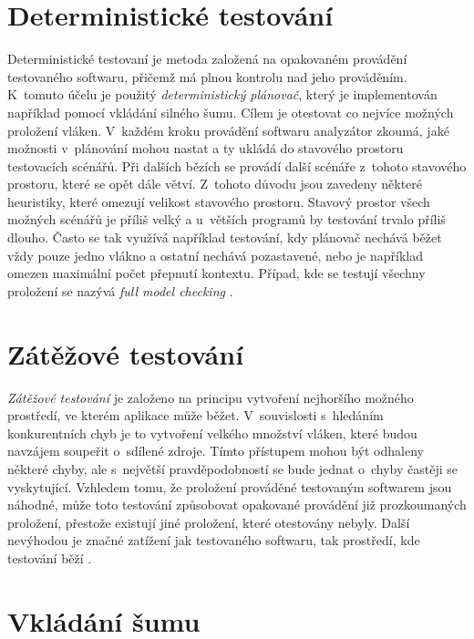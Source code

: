 \section{Deterministické testování}

Deterministické testovaní je metoda založená na opakovaném provádění testovaného softwaru, přičemž má plnou kontrolu nad jeho prováděním. K~tomuto účelu je použitý \textit{deterministický plánovač}, který je implementován například pomocí vkládání silného šumu. Cílem je otestovat co nejvíce možných proložení vláken. V~každém kroku provádění softwaru analyzátor zkoumá, jaké možnosti v~plánování mohou nastat a ty ukládá do stavového prostoru testovacích scénářů. Při dalších bězích se provádí další scénáře z~tohoto stavového prostoru, které se opět dále větví. Z~tohoto důvodu jsou zavedeny některé heuristiky, které omezují velikost stavového prostoru. Stavový prostor všech možných scénářů je příliš velký a u~větších programů by testování trvalo příliš dlouho. Často se tak využívá například testování, kdy plánovač nechává běžet vždy pouze jedno vlákno a ostatní nechává pozastavené, nebo je například omezen maximální počet přepnutí kontextu. Případ, kde se testují všechny proložení se nazývá \textit{full model checking} \cite{cite:advances}.

\section{Zátěžové testování}

\textit{Zátěžové testování} je založeno na principu vytvoření nejhoršího možného prostředí, ve kterém aplikace může běžet. V~souvislosti s~hledáním konkurentních chyb je to vytvoření velkého množství vláken, které budou navzájem soupeřit o~sdílené zdroje. Tímto přístupem mohou být odhaleny některé chyby, ale s~největší pravděpodobností se bude jednat o~chyby častěji se vyskytující. Vzhledem tomu, že proložení prováděné testovaným softwarem jsou náhodné, může toto testování způsobovat opakované provádění již prozkoumaných proložení, přestože existují jiné proložení, které otestovány nebyly. Další nevýhodou je značné zatížení jak testovaného softwaru, tak prostředí, kde testování běží \cite{cite:advances}.

\section{Vkládání šumu}

